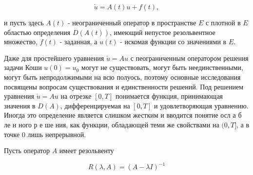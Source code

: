 \documentclass[10pt]{article}
\begin{document}
\[

\dot{u}=A(t) u+f(t),

\]



и пусть здесь $A(t)$ - неограниченный оператор в пространстве $E$ с плотной в $E$ областью определения $D(A(t))$, имеющий непустое резольвентное множество, $f(t)$ - заданная, а $u(t)$ - искомая функции со значениями в $E$.



Даже для простейшего уравнения $\dot{u}=A u$ с пеограниченным оператором решения задачи Коши $u(0)=u_{0}$ могут не существовать, могут быть неединственными, могут быть непродолжимыми на всю полуось, поэтому основные исследования посвящены вопросам существования и единственности решений. Под решением уравнения $\dot{u}=A u$ на отрезке $[0, T]$ понимается функция, принимающая значения в $D(A)$, дифференцируемая на $[0, T]$ и удовлетворяющая уравнению. Иногда это определение является слишком жестким и вводится понятие осл а б ле н ного р е ше ния, как функции, обладающей теми же свойствами на $(0, T]$, а в точке 0 лишь непрерывной.



Пусть оператор $A$ имеет резольвенту



\[

R(\lambda, A)=(A-\lambda I)^{-1}

\]
\end{document}
